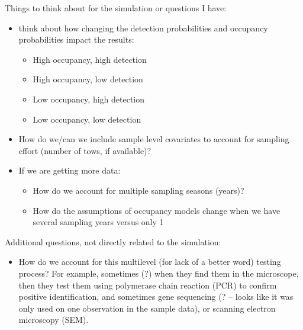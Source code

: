 \documentclass[12pt]{article}\usepackage[]{graphicx}\usepackage[]{color}
\begin{document}
Things to think about for the simulation or questions I have: 
\begin{itemize}
\item think about how changing the detection probabilities and occupancy probabilities impact the results: 
	\begin{itemize}
	\item High occupancy, high detection
	\item High occupancy, low detection 
	\item Low occupancy, high detection 
	\item Low occupancy, low detection 
	\end{itemize}
\item How do we/can we include sample level covariates to account for sampling effort (number of tows, if available)?
\item If we are getting more data:
	\begin{itemize}
	\item How do we account for multiple sampling seasons (years)? 
	\item How do the assumptions of occupancy models change when we have several sampling years versus only 1
\end{itemize}
\end{itemize}

Additional questions, not directly related to the simulation:
\begin{itemize}
	\item How do we account for this multilevel (for lack of a better word) testing process? For example, sometimes (?) when they find them in the microscope, then they test them using polymerase chain reaction (PCR) to confirm positive identification, and sometimes gene sequencing (? -- looks like it was only used on one observation in the sample data), or scanning electron microscopy (SEM).
\end{itemize}

\singlespacing
\end{document}
